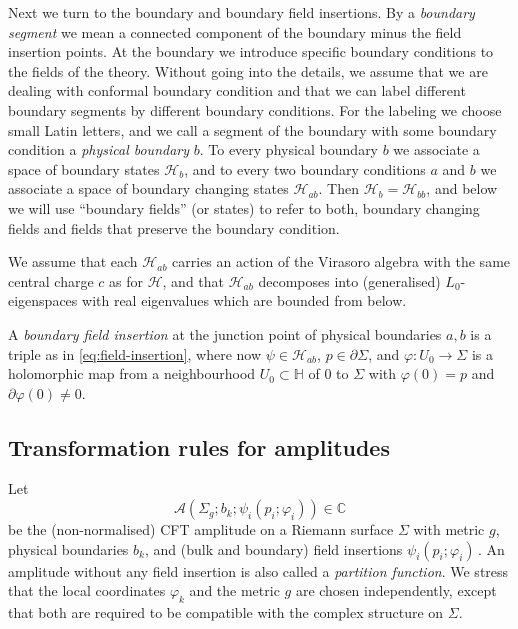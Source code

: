 \documentclass[11pt,a4paper]{article}
\numberwithin{equation}{section}
\begin{document}
\smallskip
Next we turn to the boundary and boundary field insertions. By a \textit{boundary segment} we mean a connected component of the boundary minus the field insertion points.  
At the boundary we introduce specific boundary conditions to the fields of the theory. Without going into the details, we assume that we are dealing with conformal boundary condition and that we can label different boundary segments by different boundary conditions. For the labeling we choose small Latin letters, and we call a segment of the boundary with some boundary condition a \textit{physical boundary} $b$. To every physical boundary $b$ we associate a space of boundary states $\mathcal{H}_b$, and to every two boundary conditions $a$ and $b$ we associate a space of boundary changing states $\mathcal{H}_{ab}$. Then $\mathcal{H}_b = \mathcal{H}_{bb}$, and below we will use ``boundary fields'' (or states) to refer to both, boundary changing fields and fields that preserve the boundary condition.

We assume that each $\mathcal{H}_{ab}$ carries an action of the Virasoro algebra with the same central charge $c$ as for $\mathcal{H}$, and that $\mathcal{H}_{ab}$ decomposes into (generalised) $L_0$-eigenspaces with real eigenvalues which are bounded from below.

\smallskip
A \textit{boundary field insertion} at the junction point of physical boundaries $a,b$
is a triple as in \eqref{eq:field-insertion}, where now
$\psi\in\mathcal{H}_{ab}$, $p \in \partial\Sigma$, and $\varphi: U_0\to\Sigma$ is a holomorphic map from a neighbourhood $U_0\subset\mathbb{H}$ of $0$ to $\Sigma$ with $\varphi(0) = p$ and $\partial\varphi(0) \neq 0$. 

\subsection{Transformation rules for amplitudes} \label{sec:amplitute}

Let
%
\begin{equation}
    \mathcal{A}\!\left(\Sigma_{g};b_k;\psi_i(p_i;\varphi_i)\right)\in \mathbb{C}
\end{equation}
%
be the (non-normalised) CFT amplitude on a Riemann surface $\Sigma$ with metric $g$, physical boundaries $b_k$, and (bulk and boundary) field insertions $\psi_i(p_i;\varphi_i)$\,. An amplitude without any field insertion is also called a \textit{partition function}. We stress that the local coordinates $\varphi_k$ and the metric $g$ are chosen independently, except that both are required to be compatible with the complex structure on $\Sigma$.
\end{document}

